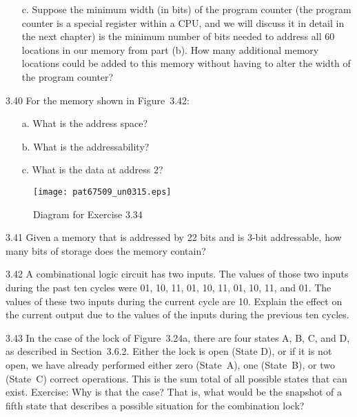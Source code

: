 \documentclass{patt}
\begin{document}
\begin{exercises}
\begin{enumerate}[c.]
\item[c.] Suppose the minimum width (in bits) of the program counter
  (the program counter is a special register within a CPU, and we will
  discuss it in detail in the next chapter) is the minimum number of
  bits needed to address all 60 locations in our memory from part (b).
  How many additional memory locations could be added to this memory
  without having to alter the width of the program counter?
\end{enumerate}

\newpage

\item[3.40] For the memory shown in Figure~3.42:
\begin{enumerate}[c.]
\item[a.] What is the address space?
\item[b.] What is the addressability?
\item[c.] What is the data at address 2?
\end{enumerate}

  \begin{figure}[h]
\hspace*{-8pc}\begin{minipage}{36pc}
  \centerline{\texttt{[image: pat67509\_un0315.eps]}}
  \caption{Diagram for Exercise 3.34}
  \end{minipage}
  \vspace{-6pt}
  \end{figure}

\vfill\pagebreak

\newpage


\item[3.41] Given a memory that is addressed by 22 bits and is
  3-bit addressable, how many bits of storage does the memory
  contain?


\item[3.42] A combinational logic circuit has two inputs. The values
  of those two inputs during the past ten cycles were 01, 10, 11, 01,
  10, 11, 01, 10, 11, and 01. The values of these two inputs during
  the current cycle are 10. Explain the effect on the current output
  due to the values of the inputs during the previous ten cycles.



\item[3.43] In the case of the lock of Figure~3.24a, there are four
  states A, B, C, and D, as described in Section~3.6.2.  Either the
  lock is open (State D), or if it is not open, we have already
  performed either zero (State~A), one (State~B), or two (State~C)
  correct operations.  This is the sum total of all possible states
  that can exist.  Exercise: Why is that the case?  That is, what
  would be the snapshot of a fifth state that describes a possible
  situation for the combination lock?


\end{exercises}
\end{document}
